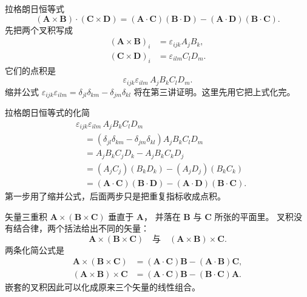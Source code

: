 \documentclass[fontset=windows, chinese, 10pt, xcolor=dvipsnames]{beamer}
\begin{document}
\begin{frame}{拉格朗日恒等式}
  \begin{equation*}
    (\mathbf{A}\times\mathbf{B})\cdot(\mathbf{C}\times\mathbf{D})
    = (\mathbf{A}\cdot\mathbf{C})(\mathbf{B}\cdot\mathbf{D})
    - (\mathbf{A}\cdot\mathbf{D})(\mathbf{B}\cdot\mathbf{C}).
  \end{equation*}
  先把两个叉积写成
  \begin{align*}
    (\mathbf{A}\times\mathbf{B})_i
    &= \varepsilon_{ijk} A_j B_k,\\
    (\mathbf{C}\times\mathbf{D})_i
    &= \varepsilon_{ilm} C_l D_m.
  \end{align*}
  它们的点积是
  \begin{equation*}
    \varepsilon_{ijk}\varepsilon_{ilm}\, A_j B_k C_l D_m.
  \end{equation*}
  缩并公式
  $\varepsilon_{ijk}\varepsilon_{ilm}
  =\delta_{jl}\delta_{km}-\delta_{jm}\delta_{kl}$
  将在第三讲证明。这里先用它把上式化完。
\end{frame}

\begin{frame}{拉格朗日恒等式的化简}
  \begin{align*}
    &\varepsilon_{ijk}\varepsilon_{ilm}\, A_j B_k C_l D_m \\
    &\quad = (\delta_{jl}\delta_{km}-\delta_{jm}\delta_{kl})
      A_j B_k C_l D_m \\
    &\quad = A_j B_k C_j D_k
      - A_j B_k C_k D_j \\
    &\quad = (A_j C_j)(B_k D_k)
      - (A_j D_j)(B_k C_k) \\
    &\quad = (\mathbf{A}\cdot\mathbf{C})(\mathbf{B}\cdot\mathbf{D})
      - (\mathbf{A}\cdot\mathbf{D})(\mathbf{B}\cdot\mathbf{C}).
  \end{align*}
  第一步用了缩并公式，后面两步只是把重复指标收成点积。
\end{frame}

\begin{frame}{矢量三重积}
  $\mathbf{A}\times(\mathbf{B}\times\mathbf{C})$ 垂直于 $\mathbf{A}$，
  并落在 $\mathbf{B}$ 与 $\mathbf{C}$ 所张的平面里。
  叉积没有结合律，两个括法给出不同的矢量：
  \begin{equation*}
    \mathbf{A}\times(\mathbf{B}\times\mathbf{C})
    \quad\text{与}\quad
    (\mathbf{A}\times\mathbf{B})\times\mathbf{C}.
  \end{equation*}
  两条化简公式是
  \begin{align*}
    \mathbf{A}\times(\mathbf{B}\times\mathbf{C})
    &= (\mathbf{A}\cdot\mathbf{C})\mathbf{B}
     - (\mathbf{A}\cdot\mathbf{B})\mathbf{C},\\
    (\mathbf{A}\times\mathbf{B})\times\mathbf{C}
    &= (\mathbf{A}\cdot\mathbf{C})\mathbf{B}
     - (\mathbf{B}\cdot\mathbf{C})\mathbf{A}.
  \end{align*}
  嵌套的叉积因此可以化成原来三个矢量的线性组合。
\end{frame}
\end{document}
